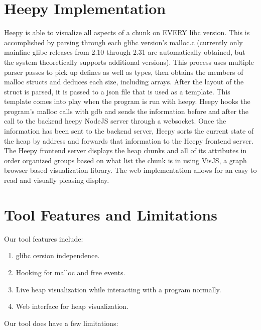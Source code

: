 \documentclass[12pt]{article}
\begin{document}
\section{Heepy Implementation}

Heepy is able to visualize all aspects of a chunk on EVERY libc version. This is accomplished by parsing through each glibc version’s malloc.c (currently only mainline glibc releases from 2.10 through 2.31 are automatically obtained, but the system theoretically supports additional versions). This process uses multiple parser passes to pick up defines as well as types, then obtains the members of malloc structs and deduces each size, including arrays. After the layout of the struct is parsed, it is passed to a json file that is used as a template. This template comes into play when the program is run with heepy. Heepy hooks the program’s malloc calls with gdb and sends the information before and after the call to the backend heepy NodeJS server through a websocket. Once the information has been sent to the backend server, Heepy sorts the current state of the heap by address and forwards that information to the Heepy frontend server. The Heepy frontend server displays the heap chunks and all of its attributes in order organized groups based on what list the chunk is in using VisJS, a graph browser based visualization library. The web implementation allows for an easy to read and visually pleasing display. \\

\section{Tool Features and Limitations}

Our tool features include: \\

\begin{enumerate}
    \item glibc cersion independence. \\
    \item Hooking for malloc and free events. \\
    \item Live heap visualization while interacting with a program normally. \\
    \item Web interface for heap visualization. \\
\end{enumerate}

Our tool does have a few limitations: \\
\end{document}
